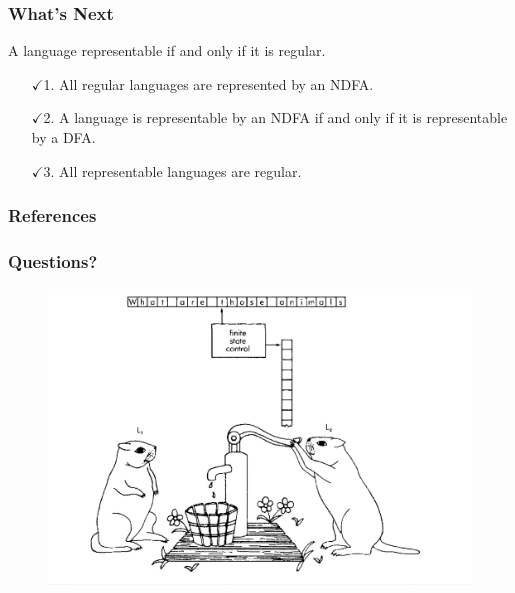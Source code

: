 \documentclass[11 pt]{beamer}
\begin{document}
\begin{frame}
	\frametitle{What's Next}
	A language representable if and only if it is regular.

	\begin{enumerate}
		\item[$\checkmark $1.] All regular languages are represented by an NDFA.
		\item[$\checkmark $2.] A language is representable by an NDFA if and only if it is representable by a DFA.
		\item[$\checkmark $3.] All representable languages are regular.
	\end{enumerate}
\end{frame}


\begin{frame}[shrink]
	\frametitle{References}
	
	\nocite{*}
	
\end{frame}


\begin{frame}[fragile]
	\frametitle{Questions?}
	\begin{figure}[H]
		\includegraphics[width = \textwidth]{../images/pumping_lemmings.png}
	\end{figure}
\end{frame}
\end{document}

